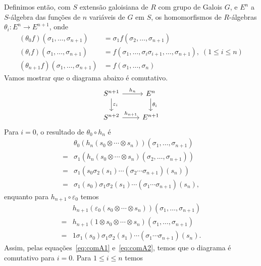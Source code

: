 Definimos então, com $S$ extensão galoisiana de $R$ com grupo de Galois $G$, e $E^n$ a $S$-álgebra das funções de $n$ variáveis de $G$ em $S$, os homomorfismos de $R$-álgebras $\theta_i: E^n \rightarrow E^{n+1}$, onde
\begin{align*}
    (\theta_0 f) (\sigma_1,\dots,\sigma_{n+1})     &=\sigma_1f(\sigma_2,\dots,\sigma_{n+1})\\
    (\theta_i f) (\sigma_1,\dots,\sigma_{n+1})     &= f(\sigma_1, \dots, \sigma_i\sigma_{i+1},\dots, \sigma_{n+1}),\; (1\leq i \leq n)\\
    (\theta_{n+1} f) (\sigma_1,\dots,\sigma_{n+1})  &= f(\sigma_1,\dots,\sigma_n)
\end{align*}
Vamos mostrar que o diagrama abaixo é comutativo.
\begin{equation} \label{diag:cohomology}
\begin{tikzcd}
S^{n+1} \arrow{d}{\varepsilon_i} \arrow{r}{h_n} & E^n \arrow{d}{\theta_i} \\
S^{n+2} \arrow{r}{h_{n+1}}                        & E^{n+1}                  
\end{tikzcd}
\end{equation}
Para $i=0$, o resultado de $\theta_0 \circ h_n$ é
\begin{equation} \label{eq:comA1} \begin{array}{rl}
    & \theta_0(h_n(s_0\otimes\cdots\otimes s_n))(\sigma_1,\dots,\sigma_{n+1})  \\
    =& \sigma_1(h_n(s_0\otimes\cdots\otimes s_n)(\sigma_2,\dots,\sigma_{n+1})) \\
    =& \sigma_1\left(s_0\sigma_2(s_1)\cdots(\sigma_2\cdots\sigma_{n+1})(s_n)\right) \\
    =& \sigma_1(s_0)\sigma_1\sigma_2(s_1)\cdots(\sigma_1\cdots\sigma_{n+1})(s_n),
\end{array}\end{equation}
enquanto para $h_{n+1}\circ \varepsilon_0$ temos
\begin{equation} \label{eq:comA2} \begin{array}{rl}
    & h_{n+1}(\varepsilon_0(s_0\otimes\cdots\otimes s_n))(\sigma_1,\dots,\sigma_{n+1}) \\
    =& h_{n+1}(1\otimes s_0\otimes\cdots\otimes s_n)(\sigma_1,\dots,\sigma_{n+1}) \\
    =& 1\sigma_1(s_0)\sigma_1\sigma_2(s_1)\cdots(\sigma_1\cdots\sigma_{n+1})(s_n).
\end{array}\end{equation}
Assim, pelas equações~\eqref{eq:comA1} e~\eqref{eq:comA2}, temos que o diagrama é comutativo para $i=0$. Para $1\leq i \leq n$ temos
